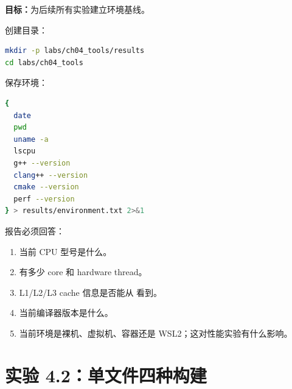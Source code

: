 \begin{labbox}
\textbf{目标：}为后续所有实验建立环境基线。

创建目录：

\begin{lstlisting}[language=bash]
mkdir -p labs/ch04_tools/results
cd labs/ch04_tools
\end{lstlisting}

保存环境：

\begin{lstlisting}[language=bash]
{
  date
  pwd
  uname -a
  lscpu
  g++ --version
  clang++ --version
  cmake --version
  perf --version
} > results/environment.txt 2>&1
\end{lstlisting}

报告必须回答：

\begin{enumerate}
  \item 当前 CPU 型号是什么。
  \item 有多少 core 和 hardware thread。
  \item L1/L2/L3 cache 信息是否能从  看到。
  \item 当前编译器版本是什么。
  \item 当前环境是裸机、虚拟机、容器还是 WSL2；这对性能实验有什么影响。
\end{enumerate}
\end{labbox}

\section{实验 4.2：单文件四种构建}

